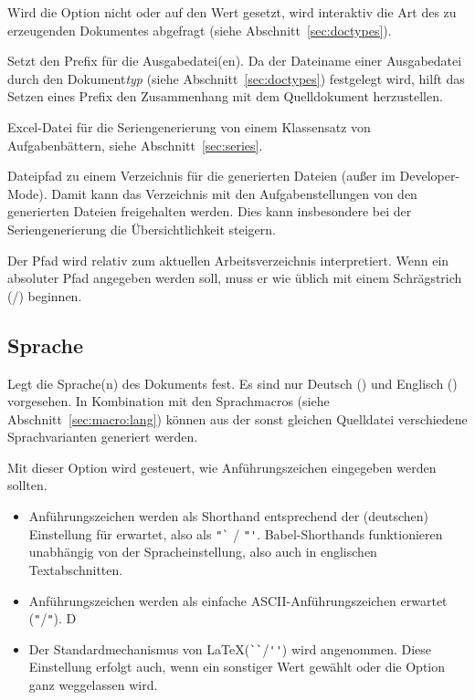 \documentclass[
load=osgexam,
babel=ngerman
]{skdoc}
\begin{document}
Wird die Option nicht oder auf den Wert  gesetzt, wird interaktiv die Art des zu erzeugenden Dokumentes
abgefragt (siehe Abschnitt~\ref{sec:doctypes}).
\medskip

Setzt den Prefix für die Ausgabedatei(en). Da der Dateiname einer Ausgabedatei durch den Dokument\emph{typ} (siehe Abschnitt~\ref{sec:doctypes}) festgelegt
wird, hilft das Setzen eines Prefix den Zusammenhang mit dem Quelldokument herzustellen.
\medskip

 Excel-Datei für die Seriengenerierung von einem Klassensatz von
Aufgabenbättern, siehe Abschnitt~\ref{sec:series}.
\medskip

Dateipfad zu einem Verzeichnis für die generierten Dateien (außer im Developer-Mode). Damit kann das Verzeichnis mit den
Aufgabenstellungen von den generierten Dateien freigehalten werden. Dies kann insbesondere bei der Seriengenerierung die
Übersichtlichkeit steigern.

Der Pfad wird relativ zum aktuellen Arbeitsverzeichnis interpretiert. Wenn ein absoluter Pfad angegeben werden soll,
muss er wie üblich mit einem Schrägstrich (/) beginnen.
\medskip

\subsection*{Sprache}
Legt die Sprache(n) des Dokuments fest. Es sind nur Deutsch () und Englisch () vorgesehen. In
Kombination mit den Sprachmacros (siehe Abschnitt~\ref{sec:macro:lang}) können aus der sonst gleichen Quelldatei verschiedene
Sprachvarianten generiert werden.\medskip

Mit dieser Option wird gesteuert, wie Anführungszeichen eingegeben werden sollten.
\begin{itemize}[nosep]
  \item [\opt{babelshorthands}] Anführungszeichen werden als Shorthand entsprechend der (deutschen) Einstellung für
     erwartet, also als \verb!"`! / \verb!"'!. Babel-Shorthands funktionieren unabhängig von der
    Spracheinstellung, also auch in englischen Textabschnitten.
  \item [\opt{ascii}] Anführungszeichen werden als einfache ASCII-Anführungszeichen erwartet (\verb!"!/\verb!"!). D
  \item [\opt{latex}]  Der Standardmechanismus von \LaTeX (\verb!``!/\verb!''!) wird angenommen. Diese Einstellung
    erfolgt auch, wenn ein sonstiger Wert gewählt oder die Option ganz weggelassen wird.
\end{itemize}
\medskip
\end{document}
